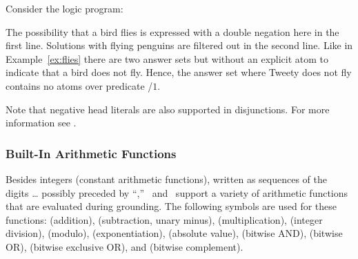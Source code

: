 \begin{example}\label{ex:as:flynn}
Consider the logic program:


The possibility that a bird flies is expressed with a double negation here in the first line.
Solutions with flying penguins are filtered out in the second line.
Like in Example~\ref{ex:flies} there are two answer sets
but without an explicit atom to indicate that a bird does not fly.
Hence, the answer set where Tweety does not fly contains no atoms over predicate /$1$.
\eexample
\end{example}

\begin{Note}
  Note that negative head literals are also supported in disjunctions.
  For more information see \cite{litatu99a}.
\end{Note}

\subsubsection{Built-In Arithmetic Functions}\label{subsec:gringo:arith}

Besides integers (constant arithmetic functions),
written as sequences of the digits \dots{}
possibly preceded by ``\code{-},''
\gringo\ and \clingo\ support a variety of arithmetic functions that
are evaluated during grounding.
The following symbols are used for these functions:
\code{+} (addition),
\code{-} (subtraction, unary minus),
\code{*} (multiplication),
\code{/} (integer division),
\code{\textbackslash} (modulo),
\code{**} (exponentiation),
\code{|$\cdot$|} (absolute value),
\code{\&} (bitwise AND),
 (bitwise OR),
\code{\^} (bitwise exclusive OR), and
\code{\textasciitilde} (bitwise complement).

